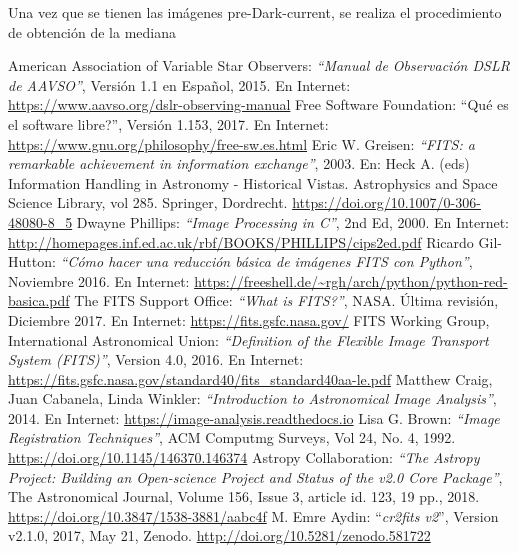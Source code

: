 \documentclass[a4paper, 12pt]{article}
\begin{document}
 Una vez que se tienen las imágenes pre-Dark-current, se realiza el procedimiento de obtención de la mediana 

 



   

\begin{thebibliography}{100}
 American Association of Variable Star Observers: {\it ``Manual de Observación DSLR de AAVSO''}, Versión 1.1 en Español, 2015. En Internet: \url{https://www.aavso.org/dslr-observing-manual}
   Free Software Foundation: {``Qué es el software libre?''}, Versión 1.153, 2017. En Internet: \url{https://www.gnu.org/philosophy/free-sw.es.html}
 Eric W. Greisen: {\it ``FITS: a remarkable achievement in information exchange''}, 2003. En: Heck A. (eds) Information Handling in Astronomy - Historical Vistas. Astrophysics and Space Science Library, vol 285. Springer, Dordrecht. \url{https://doi.org/10.1007/0-306-48080-8_5}
 Dwayne Phillips: {\it ``Image Processing in C''}, 2nd Ed, 2000. En Internet: \url{http://homepages.inf.ed.ac.uk/rbf/BOOKS/PHILLIPS/cips2ed.pdf}
 Ricardo Gil-Hutton: {\it ``Cómo hacer una reducción básica de imágenes FITS con Python''}, Noviembre 2016. En Internet: \url{https://freeshell.de/~rgh/arch/python/python-red-basica.pdf}
 The FITS Support Office: {\it ``What is FITS?''}, NASA. Última revisión, Diciembre 2017.  En Internet: \url{https://fits.gsfc.nasa.gov/}
 FITS Working Group, International Astronomical Union: {\it ``Definition of the Flexible Image Transport System (FITS)''}, Version 4.0, 2016. En Internet: \url{https://fits.gsfc.nasa.gov/standard40/fits_standard40aa-le.pdf}
 Matthew Craig, Juan Cabanela, Linda Winkler: {\it ``Introduction to Astronomical Image Analysis''}, 2014. En Internet: \url{https://image-analysis.readthedocs.io}
 Lisa G. Brown: {\it ``Image Registration Techniques''}, ACM Computmg Surveys, Vol 24, No. 4, 1992. \url{https://doi.org/10.1145/146370.146374}
 Astropy Collaboration: {\it ``The Astropy Project: Building an Open-science Project and Status of the v2.0 Core Package''}, The Astronomical Journal, Volume 156, Issue 3, article id. 123, 19 pp., 2018. \url{https://doi.org/10.3847/1538-3881/aabc4f}
  M. Emre Aydin: ``{\it cr2fits v2}'', Version v2.1.0, 2017, May 21, Zenodo. \url{http://doi.org/10.5281/zenodo.581722}
\end{thebibliography}
\end{document}

